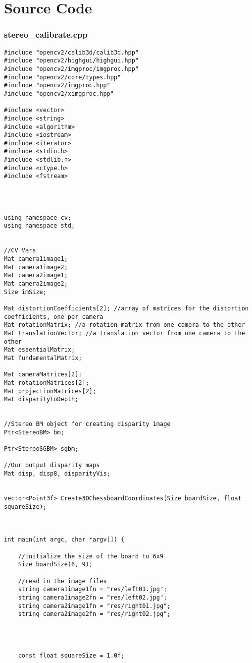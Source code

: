 \thispagestyle{plain}
\section{Source Code}
\subsubsection{stereo\_calibrate.cpp}
\begin{verbatim}
#include "opencv2/calib3d/calib3d.hpp"
#include "opencv2/highgui/highgui.hpp"
#include "opencv2/imgproc/imgproc.hpp"
#include "opencv2/core/types.hpp"
#include "opencv2/imgproc.hpp"
#include "opencv2/ximgproc.hpp"

#include <vector>
#include <string>
#include <algorithm>
#include <iostream>
#include <iterator>
#include <stdio.h>
#include <stdlib.h>
#include <ctype.h>
#include <fstream>




using namespace cv;
using namespace std;


//CV Vars
Mat camera1image1;
Mat camera1image2;
Mat camera2image1;
Mat camera2image2;
Size imSize;

Mat distortionCoefficients[2]; //array of matrices for the distortion coefficients, one per camera
Mat rotationMatrix; //a rotation matrix from one camera to the other
Mat translationVector; //a translation vector from one camera to the other
Mat essentialMatrix;
Mat fundamentalMatrix;

Mat cameraMatrices[2];
Mat rotationMatrices[2];
Mat projectionMatrices[2];
Mat disparityToDepth;


//Stereo BM object for creating disparity image
Ptr<StereoBM> bm;

Ptr<StereoSGBM> sgbm;

//Our output disparity maps
Mat disp, disp8, disparityVis;


vector<Point3f> Create3DChessboardCoordinates(Size boardSize, float squareSize);



int main(int argc, char *argv[]) {

	//initialize the size of the board to 6x9
	Size boardSize(6, 9);

	//read in the image files
	string camera1image1fn = "res/left01.jpg";
	string camera1image2fn = "res/left02.jpg";
	string camera2image1fn = "res/right01.jpg";
	string camera2image2fn = "res/right02.jpg";




	const float squareSize = 1.0f;


\end{verbatim}
